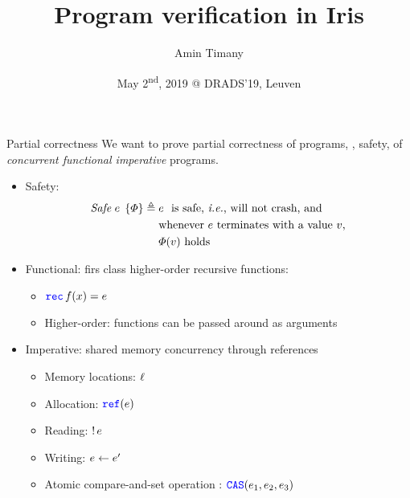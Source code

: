 \documentclass{beamer}
\begin{document}
\title{Program verification in Iris}
\author{Amin Timany}
\date{May 2\textsuperscript{nd}, 2019 @ DRADS'19, Leuven}

\frame{\titlepage}

\begin{frame}[t]{Partial correctness}
  We want to prove partial correctness of programs, \ie, safety, of \emph{concurrent functional imperative} programs.
  \begin{itemize}
  \item Safety:
    \begin{align*}
      \mathit{Safe}\;{e}\;\left\{\varPhi\right\} \triangleq{} & e ~\text{ is safe, \textit{i.e.}, will not crash, and}\\
      & \text{whenever $e$ terminates with a value $v$,}\\
      & \text{$\varPhi(v)$ holds }
    \end{align*}
  \item Functional: firs class higher-order recursive functions:
    \begin{itemize}
    \item $\Rec f \var = \expr$
    \item Higher-order: functions can be passed around as arguments
    \end{itemize}
  \item Imperative: shared memory concurrency through references
    \begin{itemize}
    \item Memory locations: $\ell$
    \item Allocation: $\Ref(\expr)$
    \item Reading: $\mathop{!} e$
    \item Writing: $e \leftarrow e'$
    \item Atomic compare-and-set operation : $\texttt{\color{blue} CAS}(e_1, e_2, e_3)$
    \end{itemize}
  \end{itemize}
\end{frame}
\end{document}
